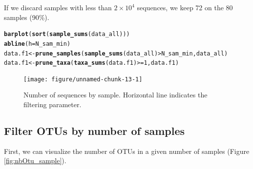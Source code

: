 \documentclass[12pt]{article}\usepackage[]{graphicx}\usepackage[]{color}
\makeatletter
\newcommand{\hlnum}[1]{\textcolor[rgb]{0.686,0.059,0.569}{#1}}%
\newcommand{\hlopt}[1]{\textcolor[rgb]{0,0,0}{#1}}%
\newcommand{\hlstd}[1]{\textcolor[rgb]{0.345,0.345,0.345}{#1}}%
\newcommand{\hlkwb}[1]{\textcolor[rgb]{0.69,0.353,0.396}{#1}}%
\newcommand{\hlkwc}[1]{\textcolor[rgb]{0.333,0.667,0.333}{#1}}%
\newcommand{\hlkwd}[1]{\textcolor[rgb]{0.737,0.353,0.396}{\textbf{#1}}}%
\newenvironment{kframe}{%
 \def\at@end@of@kframe{}%
 \ifinner\ifhmode%
  \def\at@end@of@kframe{\end{minipage}}%
  \begin{minipage}{\columnwidth}%
 \fi\fi%
 \def\FrameCommand##1{\hskip\@totalleftmargin \hskip-\fboxsep
 \colorbox{shadecolor}{##1}\hskip-\fboxsep
     \hskip-\linewidth \hskip-\@totalleftmargin \hskip\columnwidth}%
 \MakeFramed {\advance\hsize-\width
   \@totalleftmargin\z@ \linewidth\hsize
   \@setminipage}}%
 {\par\unskip\endMakeFramed%
 \at@end@of@kframe}
\newenvironment{knitrout}{}{} %
\numberwithin{figure}{section}
\makeatother
\begin{document}
If we discard samples with less than \ensuremath{2\times 10^{4}} sequences, we keep 72 on the 80 samples (90\%).

\begin{knitrout}\small
{}\color{fgcolor}\begin{kframe}
\begin{alltt}
\hlkwd{barplot}\hlstd{(}\hlkwd{sort}\hlstd{(}\hlkwd{sample_sums}\hlstd{(data_all)))}
\hlkwd{abline}\hlstd{(}\hlkwc{h} \hlstd{= N_sam_min)}
\hlstd{data.f1} \hlkwb{<-} \hlkwd{prune_samples}\hlstd{(}\hlkwd{sample_sums}\hlstd{(data_all)} \hlopt{>} \hlstd{N_sam_min, data_all)}
\hlstd{data.f1} \hlkwb{<-} \hlkwd{prune_taxa}\hlstd{(}\hlkwd{taxa_sums}\hlstd{(data.f1)} \hlopt{>=}  \hlnum{1}\hlstd{, data.f1)}
\end{alltt}
\end{kframe}\begin{figure}

{\centering \texttt{[image: figure/unnamed-chunk-13-1]} 

}

\caption[Number of sequences by sample]{Number of sequences by sample. Horizontal line indicates the filtering parameter.}\label{fig:unnamed-chunk-13}
\end{figure}


\end{knitrout}

  \subsection{Filter OTUs by number of samples}

First, we can visualize the number of OTUs in a given number of samples (Figure \ref{fig:nbOtu_sample}).
\end{document}
